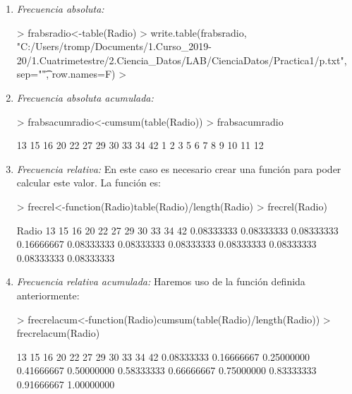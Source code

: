 \documentclass [a4paper] {article}
\begin{document}
\begin{enumerate}
\item
\textit{Frecuencia absoluta: }
\begin{Schunk}
\begin{Sinput}
> frabsradio<-table(Radio)
> write.table(frabsradio, "C:/Users/tromp/Documents/1.Curso_2019-20/1.Cuatrimetestre/2.Ciencia_Datos/LAB/CienciaDatos/Practica1/p.txt", sep="\t", row.names=F) 
> 
\end{Sinput}
\end{Schunk}




\item
\textit{Frecuencia absoluta acumulada: }
\begin{Schunk}
\begin{Sinput}
> frabsacumradio<-cumsum(table(Radio))
> frabsacumradio
\end{Sinput}
\begin{Soutput}
13 15 16 20 22 27 29 30 33 34 42 
 1  2  3  5  6  7  8  9 10 11 12 
\end{Soutput}
\end{Schunk}

\item
\textit{Frecuencia relativa: }En este caso es necesario crear una funci\'on
para poder calcular este valor. La funci\'on es:
\begin{Schunk}
\begin{Sinput}
> frecrel<-function(Radio){table(Radio)/length(Radio)}
> frecrel(Radio)
\end{Sinput}
\begin{Soutput}
Radio
        13         15         16         20         22         27         29         30         33         34         42 
0.08333333 0.08333333 0.08333333 0.16666667 0.08333333 0.08333333 0.08333333 0.08333333 0.08333333 0.08333333 0.08333333 
\end{Soutput}
\end{Schunk}

\item
\textit{Frecuencia relativa acumulada: }Haremos uso de la funci\'on definida anteriormente:
\begin{Schunk}
\begin{Sinput}
> frecrelacum<-function(Radio){cumsum(table(Radio)/length(Radio))}
> frecrelacum(Radio)
\end{Sinput}
\begin{Soutput}
        13         15         16         20         22         27         29         30         33         34         42 
0.08333333 0.16666667 0.25000000 0.41666667 0.50000000 0.58333333 0.66666667 0.75000000 0.83333333 0.91666667 1.00000000 
\end{Soutput}
\end{Schunk}
\end{enumerate}
\end{document}
